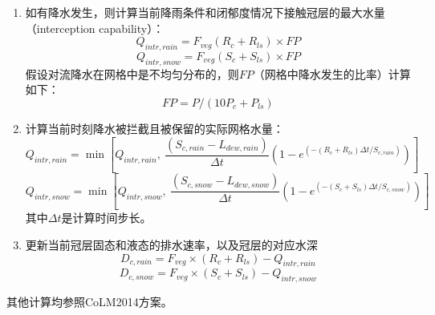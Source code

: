 \begin{enumerate}
\item 如有降水发生，则计算当前降雨条件和闭郁度情况下接触冠层的最大水量（interception capability）：
\begin{equation}
Q_{intr,rain} =F_{veg}\left(R_{c}+R_{ls}\right)\times FP
\end{equation}
\begin{equation}
Q_{intr,snow} =F_{veg}\left(S_{c}+S_{ls}\right)\times FP
\end{equation}
假设对流降水在网格中是不均匀分布的，则$FP$（网格中降水发生的比率）计算如下：
\begin{equation}
FP = P/ (10P_{c} + P_{ls})
\end{equation}
\item 计算当前时刻降水被拦截且被保留的实际网格水量：
\begin{equation}
Q_{intr,rain} = \min\left[Q_{intr,rain}, \ \frac{(S_{c,rain} - L_{dew,rain})}{\Delta{t}}  (1-e^{(-\left(R_{c}+R_{ls}\right)\Delta{t}/S_{c,rain})})\right]
\end{equation}
\begin{equation}
Q_{intr,snow} = \min\left[Q_{intr,snow},\ \frac{(S_{c,snow} - L_{dew,snow})}{\Delta{t}} (1-e^{(-\left(S_{c}+S_{ls}\right)\Delta{t}/S_{c,snow})})\right]
\end{equation}
其中${\Delta{t}}$是计算时间步长。
\item 更新当前冠层固态和液态的排水速率，以及冠层的对应水深
\begin{equation}
D_{c,rain}=F_{veg} \times (R_{c}+R_{ls})-Q_{intr,rain}
\end{equation}
\begin{equation}
D_{c,snow}=F_{veg} \times (S_{c}+S_{ls})-Q_{intr,snow}
\end{equation}
\end{enumerate}
其他计算均参照CoLM2014方案。


